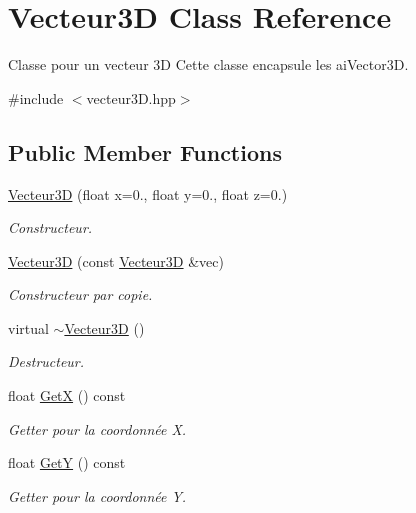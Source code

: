 \hypertarget{class_vecteur3_d}{}\section{Vecteur3D Class Reference}
\label{class_vecteur3_d}


Classe pour un vecteur 3D Cette classe encapsule les ai\+Vector3D.  




{\ttfamily \#include $<$vecteur3\+D.\+hpp$>$}

\subsection*{Public Member Functions}
\begin{DoxyCompactItemize}
\item 
\hyperlink{class_vecteur3_d_aa2e1f3f01cadb1a3489ab0a5ee469b01}{Vecteur3D} (float x=0., float y=0., float z=0.)
\begin{DoxyCompactList}\small\item\em Constructeur. \end{DoxyCompactList}\item 
\hyperlink{class_vecteur3_d_ad7960e596005df06dc7404f0ebb4ad89}{Vecteur3D} (const \hyperlink{class_vecteur3_d}{Vecteur3D} \&vec)
\begin{DoxyCompactList}\small\item\em Constructeur par copie. \end{DoxyCompactList}\item 
virtual \hyperlink{class_vecteur3_d_a5f4633710eef6f25175fb811bf811112}{$\sim$\+Vecteur3D} ()
\begin{DoxyCompactList}\small\item\em Destructeur. \end{DoxyCompactList}\item 
float \hyperlink{class_vecteur3_d_a3a5374f1fd023d46a517f0875ed0d865}{GetX} () const 
\begin{DoxyCompactList}\small\item\em Getter pour la coordonnée X. \end{DoxyCompactList}\item 
float \hyperlink{class_vecteur3_d_a160e036f4b71271fd375bc14b2e1e78c}{GetY} () const 
\begin{DoxyCompactList}\small\item\em Getter pour la coordonnée Y. \end{DoxyCompactList}\item 

\end{DoxyCompactItemize}
